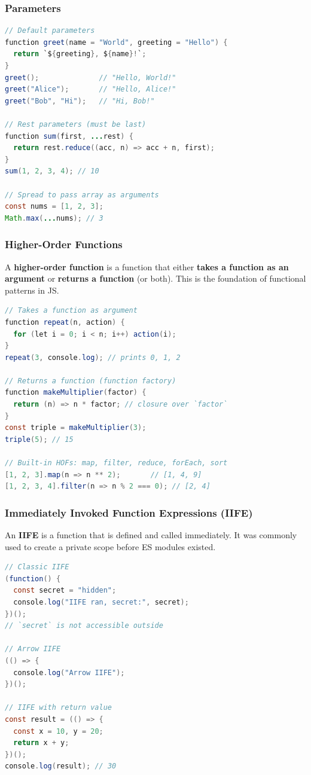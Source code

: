 \documentclass[hidelinks]{article}
\begin{document}
\subsubsection{Parameters}
\begin{lstlisting}[language=Java, caption={Default, rest, and spread in functions}]
// Default parameters
function greet(name = "World", greeting = "Hello") {
  return `${greeting}, ${name}!`;
}
greet();              // "Hello, World!"
greet("Alice");       // "Hello, Alice!"
greet("Bob", "Hi");   // "Hi, Bob!"

// Rest parameters (must be last)
function sum(first, ...rest) {
  return rest.reduce((acc, n) => acc + n, first);
}
sum(1, 2, 3, 4); // 10

// Spread to pass array as arguments
const nums = [1, 2, 3];
Math.max(...nums); // 3
\end{lstlisting}

\subsubsection{Higher-Order Functions}
A \textbf{higher-order function} is a function that either \textbf{takes a function as an argument} or \textbf{returns a function} (or both). This is the foundation of functional patterns in JS.

\begin{lstlisting}[language=Java, caption={Higher-order functions}]
// Takes a function as argument
function repeat(n, action) {
  for (let i = 0; i < n; i++) action(i);
}
repeat(3, console.log); // prints 0, 1, 2

// Returns a function (function factory)
function makeMultiplier(factor) {
  return (n) => n * factor; // closure over `factor`
}
const triple = makeMultiplier(3);
triple(5); // 15

// Built-in HOFs: map, filter, reduce, forEach, sort
[1, 2, 3].map(n => n ** 2);       // [1, 4, 9]
[1, 2, 3, 4].filter(n => n % 2 === 0); // [2, 4]
\end{lstlisting}

\subsubsection{Immediately Invoked Function Expressions (IIFE)}
An \textbf{IIFE} is a function that is defined and called immediately. It was commonly used to create a private scope before ES modules existed.

\begin{lstlisting}[language=Java, caption={IIFE pattern}]
// Classic IIFE
(function() {
  const secret = "hidden";
  console.log("IIFE ran, secret:", secret);
})();
// `secret` is not accessible outside

// Arrow IIFE
(() => {
  console.log("Arrow IIFE");
})();

// IIFE with return value
const result = (() => {
  const x = 10, y = 20;
  return x + y;
})();
console.log(result); // 30
\end{lstlisting}
\end{document}
